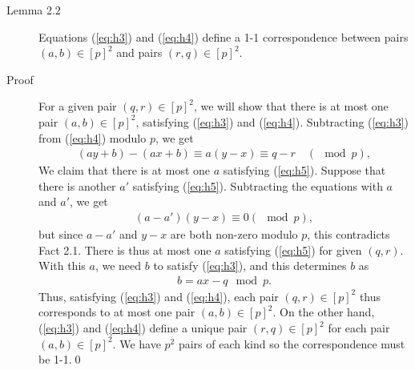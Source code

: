 \begin{description}
\item[Lemma 2.2] Equations (\ref{eq:h3}) and (\ref{eq:h4}) define a 1-1
  correspondence between pairs $(a,b)\in [p]^2$ and pairs $(r,q)\in[p]^2$.
\item[Proof] For a given pair $(q,r) \in [p]^2$, we will show that there is at
  most one pair $(a,b) \in [p]^2$, satisfying (\ref{eq:h3}) and (\ref{eq:h4}).
  Subtracting (\ref{eq:h3}) from (\ref{eq:h4}) modulo $p$, we get
  \begin{align}
    (ay+b) - (ax+b) \equiv a(y-x) \equiv q-r \quad (\mod p), \label{eq:h5}
  \end{align}
  We claim that there is at most one $a$ satisfying (\ref{eq:h5}). Suppose that
  there is another $a'$ satisfying (\ref{eq:h5}).  Subtracting the equations
  with $a$ and $a'$, we get
  \begin{align*}
    (a-a')(y-x) \equiv 0 (\mod p),
  \end{align*}
  but since $a-a'$ and $y-x$ are both non-zero modulo $p$, this contradicts Fact
  2.1. There is thus at most one $a$ satisfying (\ref{eq:h5}) for given
  $(q,r)$. With this $a$, we need $b$ to satisfy (\ref{eq:h3}), and this
  determines $b$ as
  \begin{align}
    b = ax-q\mod p. \label{eq:h6}
  \end{align}
  Thus, satisfying (\ref{eq:h3}) and (\ref{eq:h4}), each pair $(q,r)\in [p]^2$
  thus corresponds to at most one pair $(a,b)\in [p]^2$. On the other hand,
  (\ref{eq:h3}) and (\ref{eq:h4}) define a unique pair $(r,q)\in[p]^2$ for each
  pair $(a,b)\in [p]^2$. We have $p^2$ pairs of each kind so the correspondence
  must be 1-1.\qed
\end{description}